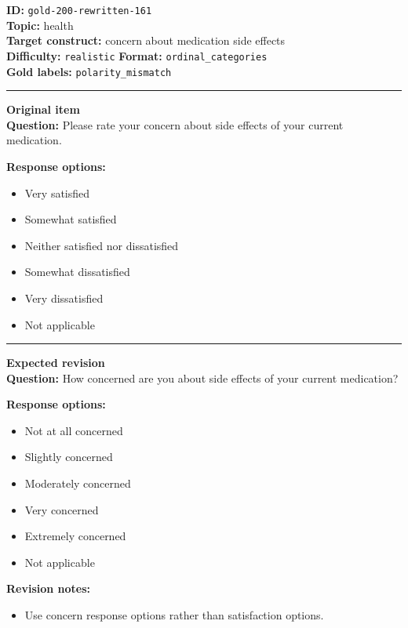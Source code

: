 \documentclass[10pt,a4paper]{article}
\newcommand{\sectionline}{\vspace{0.15em}\hrule\vspace{0.35em}}
\begin{document}
\begin{tcolorbox}[colframe=FlawRed,colback=white,colbacktitle=FlawRed!9,coltitle=black,title={Item 161\hfill Flawed item}]
\textbf{ID:} \texttt{gold-200-rewritten-161}\\
\textbf{Topic:} health\\
\textbf{Target construct:} concern about medication side effects\\
\textbf{Difficulty:} \texttt{realistic} \quad \textbf{Format:} \texttt{ordinal\_categories}\\
\textbf{Gold labels:} \texttt{polarity\_mismatch}\\
\sectionline
\textbf{Original item}\\
\textbf{Question:} Please rate your concern about side effects of your current medication.
\par\textbf{Response options:}
\begin{itemize}
\item Very satisfied
\item Somewhat satisfied
\item Neither satisfied nor dissatisfied
\item Somewhat dissatisfied
\item Very dissatisfied
\item Not applicable
\end{itemize}
\sectionline
\textbf{Expected revision}\\
\textbf{Question:} How concerned are you about side effects of your current medication?
\par\textbf{Response options:}
\begin{itemize}
\item Not at all concerned
\item Slightly concerned
\item Moderately concerned
\item Very concerned
\item Extremely concerned
\item Not applicable
\end{itemize}
\par\textbf{Revision notes:}
\begin{itemize}
\item Use concern response options rather than satisfaction options.
\end{itemize}
\end{tcolorbox}
\end{document}
